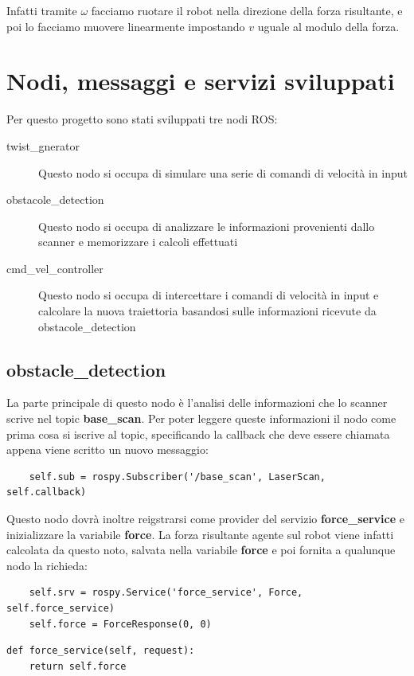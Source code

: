 \documentclass[Lau, binding=0.6cm, oneside]{sapthesis}
\begin{document}
Infatti tramite $\omega$ facciamo ruotare il robot nella direzione della forza risultante, e poi lo facciamo muovere linearmente impostando $v$ uguale al modulo della forza.

\section{Nodi, messaggi e servizi sviluppati}
Per questo progetto sono stati sviluppati tre nodi ROS:
\begin{description}
	\item[twist\_gnerator] Questo nodo si occupa di simulare una serie di comandi di velocità in input
	\item[obstacole\_detection] Questo nodo si occupa di analizzare le informazioni provenienti dallo scanner e memorizzare i calcoli effettuati
	\item[cmd\_vel\_controller] Questo nodo si occupa di intercettare i comandi di velocità in input e calcolare la nuova traiettoria basandosi sulle informazioni ricevute da obstacole\_detection
\end{description}

\subsection{obstacle\_detection}
La parte principale di questo nodo è l'analisi delle informazioni che lo scanner scrive nel topic \textbf{base\_scan}.
Per poter leggere queste informazioni il nodo come prima cosa si iscrive al topic, specificando la callback che deve essere chiamata appena viene scritto un nuovo messaggio:

\begin{lstlisting}
	self.sub = rospy.Subscriber('/base_scan', LaserScan, self.callback)
\end{lstlisting}

Questo nodo dovrà inoltre reigstrarsi come provider del servizio \textbf{force\_service} e inizializzare la variabile \textbf{force}.
La forza risultante agente sul robot viene infatti calcolata da questo noto, salvata nella variabile \textbf{force} e poi fornita a qualunque nodo la richieda:

\begin{lstlisting}
    self.srv = rospy.Service('force_service', Force, self.force_service)
    self.force = ForceResponse(0, 0)
\end{lstlisting}

\begin{lstlisting}
def force_service(self, request):
    return self.force
\end{lstlisting}
\end{document}

